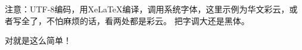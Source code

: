 \documentclass{ctexart}
\newcommand{\cy}{\CJKfamily{caiy}}
\begin{document}
注意：UTF-8编码，用XeLaTeX编译，调用系统字体，{\cy 这里示例为华文彩云}，或者写全了，{不怕麻烦的话}，看两处都是彩云。{ \heiti 把字调大还是黑}体。

对就是这么简单！
\end{document}
